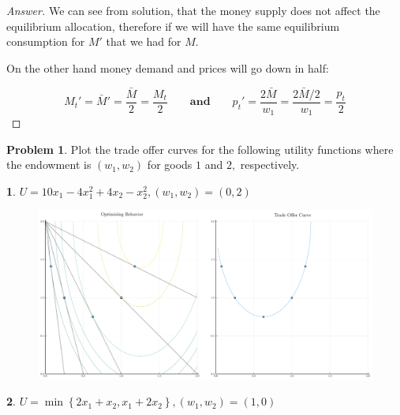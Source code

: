 \documentclass{article}
\theoremstyle{definition}
\newtheorem{problem}{Problem}
\newtheorem{subproblem}{}[problem]
\newcommand{\qaq}{\qquad \textbf{and} \qquad}
\begin{document}
\begin{proof}[Answer]
We can see from solution, that the money supply does not affect the equilibrium allocation, therefore if we will have the same equilibrium consumption for $M'$ that we had for $M$.

On the other hand money demand and prices will go down in half:

$$
M_t' =  \bar{M}' = \frac{\bar{M}}{2} = \frac{M_t}{2} \qaq p_t' = \frac{2\bar{M}}{w_1} = \frac{2\bar{M}/2}{w_1} = \frac{p_t}{2}
$$

\end{proof}
\newpage
\begin{problem}
Plot the trade offer curves for the following utility functions where the endowment is $\left(w_{1}, w_{2}\right)$
for goods $1$ and $2,$ respectively.
\end{problem}

\begin{subproblem}
$U=10 x_{1}-4 x_{1}^{2}+4 x_{2}-x_{2}^{2},\left(w_{1}, w_{2}\right)=(0,2)$
\end{subproblem}

\begin{figure}[h]
    \centering
    \includegraphics[width=1\linewidth]{Problem_Set_3_files/offer1.pdf}
    \label{fig:ex2_2}
\end{figure}

\newpage
\begin{subproblem}
$U=\min\left\{2 x_{1}+x_{2}, x_{1}+2 x_{2}\right\},\left(w_{1}, w_{2}\right)=(1,0)$
\end{subproblem}
\end{document}
